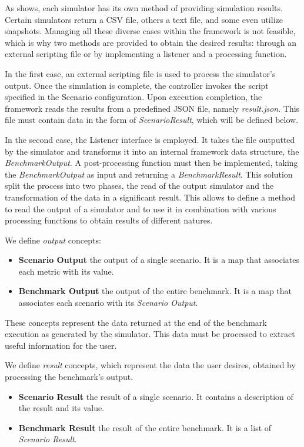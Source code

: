\documentclass[12pt,a4paper,openright,twoside]{book}
\begin{document}
As  shows, each simulator has its own method of providing simulation results. Certain simulators return a CSV file, others a text file, and some even utilize snapshots. 
Managing all these diverse cases within the framework is not feasible, which is why two methods are provided to obtain the desired results: through an external scripting file or by implementing a listener and a processing function.

In the first case, an external scripting file is used to process the simulator's output. 
Once the simulation is complete, the controller invokes the script specified in the Scenario configuration. 
Upon execution completion, the framework reads the results from a predefined JSON file, namely \textit{result.json}. 
This file must contain data in the form of \emph{ScenarioResult}, which will be defined below.

In the second case, the Listener interface is employed. It takes the file outputted by the simulator and transforms it into an internal framework data structure, the \emph{BenchmarkOutput}. 
A post-processing function must then be implemented, taking the \emph{BenchmarkOutput} as input and returning a \emph{BenchmarkResult}. 
This solution split the process into two phases, the read of the output simulator and the transformation of the data in a significant result.
This allows to define a method to read the output of a simulator and to use it in combination with various processing functions to obtain results of different natures.

We define \emph{output} concepts:
\begin{itemize}
  \item \textbf{Scenario Output} the output of a single scenario. It is a map that associates each metric with its value.
  \item \textbf{Benchmark Output} the output of the entire benchmark. It is a map that associates each scenario with its \emph{Scenario Output}.
\end{itemize}

These concepts represent the data returned at the end of the benchmark execution as generated by the simulator.
This data must be processed to extract useful information for the user.

We define \emph{result} concepts, which represent the data the user desires, obtained by processing the benchmark's output.
\begin{itemize}
  \item \textbf{Scenario Result} the result of a single scenario. It contains a description of the result and its value.
  \item \textbf{Benchmark Result} the result of the entire benchmark. It is a list of \emph{Scenario Result}.
\end{itemize}
\end{document}
